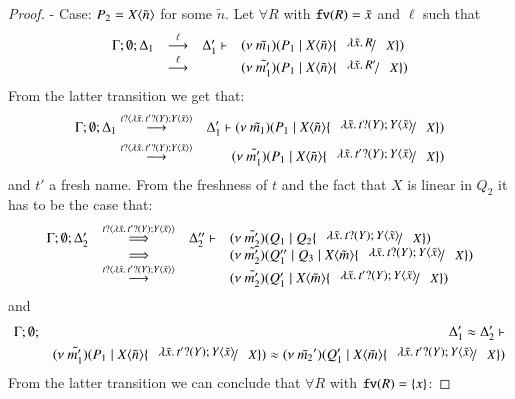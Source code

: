 \begin{proof}

	\noi - Case: $P_2 = X\langle \tilde{n} \rangle$ for some $\tilde{n}$.
%
	Let $\forall R$ with $\mathtt{fv}(R) = \tilde{x}$ and $\ell$ such that
%
\[
	\mhorel{\Gamma}{\Delta_1}{\newsp{\tilde{m_1}}{P_1 \Par \appl{X}{\tilde{n}} \subst{\abs{\tilde{x}}{R}}{X}}}{\by{\ell}}
	{\Delta_1'}{}{\newsp{\tilde{m_1'}}{P_1 \Par \appl{X}{\tilde{n}} \subst{\abs{\tilde{x}}{R'}}{X}}}
\]
%
	\noi From the latter transition we get that:
%
	\begin{eqnarray}
		\Gamma; \es; \Delta_1 &\by{\bactinp{t}{\abs{\tilde{x}}{\binp{t'}{Y} \appl{Y}{\tilde{x}}}}}& \Delta_1' \proves
		\newsp{\tilde{m_1}}{P_1 \Par \appl{X}{\tilde{n}} \subst{\abs{\tilde{x}}{\binp{t}{Y} \appl{Y}{\tilde{x}}}}{X}} \nonumber \\
		&\by{\bactinp{t}{\abs{\tilde{x}}{\binp{t'}{Y} \appl{Y}{\tilde{x}}}}}& 
		\newsp{\tilde{m_1'}}{P_1 \Par \appl{X}{\tilde{n}} \subst{\abs{\tilde{x}}{\binp{t'}{Y} \appl{Y}{\tilde{x}}}}{X}}
		\label{lem:subst_equiv5}
	\end{eqnarray}
%
	\noi and $t'$ a fresh name. From the freshness of $t$ and the fact that $X$ is linear in $Q_2$
	it has to be the case that:
%
\[
	\begin{array}{rcll}
		\Gamma; \es; \Delta_2' &\By{\bactinp{t}{\abs{\tilde{x}}{\binp{t'}{Y} \appl{Y}{\tilde{x}}}}}& \Delta_2'' \proves &
		\newsp{\tilde{m_2'}}{Q_1 \Par Q_2 \subst{\abs{\tilde{x}}{\binp{t}{Y} \appl{Y}{\tilde{x}}}}{X}}\\
		&\By{}& &
		\newsp{\tilde{m_2'}}{Q_1'' \Par Q_3 \Par \appl{X}{\tilde{m}} \subst{\abs{\tilde{x}}{\binp{t}{Y} \appl{Y}{\tilde{x}}}}{X}} \\
		&\by{\bactinp{t}{\abs{\tilde{x}}{\binp{t'}{Y} \appl{Y}{\tilde{x}}}}}& &
		\newsp{\tilde{m_2'}}{Q_1' \Par \appl{X}{\tilde{m}} \subst{\abs{\tilde{x}}{\binp{t'}{Y} \appl{Y}{\tilde{x}}}}{X}} \\
	\end{array}
\]
%
	\noi and
%
	\begin{eqnarray}
		\Gamma; \es; &&\Delta_1' \wb \Delta_2' \proves \nonumber \\
		&&\newsp{\tilde{m_1'}}{P_1 \Par \appl{X}{\tilde{n}} \subst{\abs{\tilde{x}}{\binp{t'}{Y} \appl{Y}{\tilde{x}}}}{X}} \wb
		\newsp{\tilde{m_2}'}{Q_1' \Par \appl{X}{\tilde{m}} \subst{\abs{\tilde{x}}{\binp{t'}{Y} \appl{Y}{\tilde{x}}}}{X}}
		\label{lem:subst_equiv6}
	\end{eqnarray} 
%
	\noi From the latter transition we can conclude that $\forall R$ with $\mathtt{fv}(R) = \{x\}$:

\end{proof}
